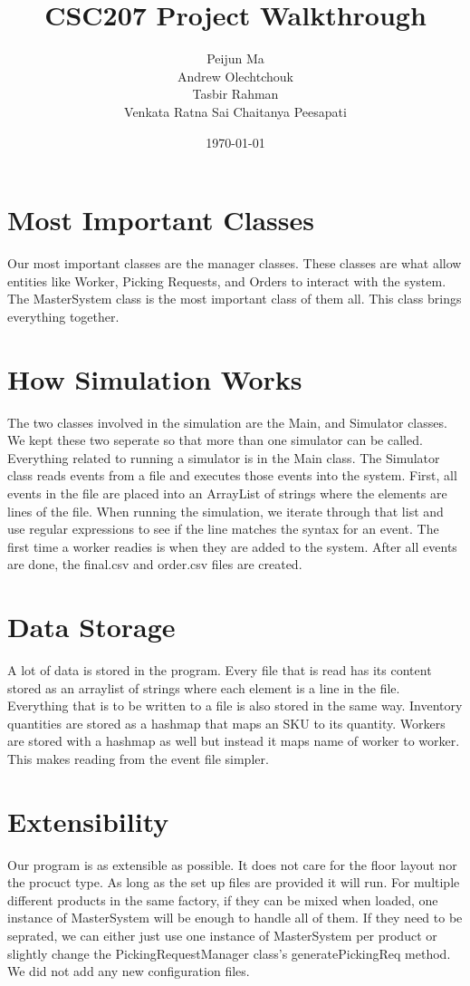 \documentclass[12pt]{article}
\title{CSC207 Project Walkthrough}
\author{Peijun Ma\\Andrew Olechtchouk\\Tasbir Rahman\\Venkata Ratna Sai Chaitanya Peesapati}
\date{\today}
\begin{document}
    \maketitle
    \pagebreak

\section*{Most Important Classes}
	Our most important classes are the manager classes. These classes are what allow entities like Worker, Picking Requests,
and Orders to interact with the system. The MasterSystem class is the most important class of them all. This class brings everything together.
\pagebreak

\section*{How Simulation Works}
	The two classes involved in the simulation are the Main, and Simulator classes. We kept these two seperate so that more
than one simulator can be called. Everything related to running a simulator is in the Main class. The Simulator class reads events from a file and executes those events into the system. First, all events in the file are placed into an ArrayList of strings where the elements are lines of the file. When running the simulation, we iterate through that list and use regular expressions to see if the line matches the syntax for an event. The first time a worker readies is when they are added to the system. After
all events are done, the final.csv and order.csv files are created.
\pagebreak

\section*{Data Storage}
	A lot of data is stored in the program. Every file that is read has its content stored as an arraylist of strings where each element is a line in the file. Everything that is to be written to a file is also stored in the same way. Inventory quantities are stored as a hashmap that maps an SKU to its quantity. Workers are stored with a hashmap as well but instead it maps name of worker to worker. This makes reading from the event file simpler.
\pagebreak
\section*{Extensibility}
    Our program is as extensible as possible. It does not care for the floor layout nor the procuct type. As long as the set up files are provided it will run. For multiple different products in the same factory, if they can be mixed when loaded, one instance of MasterSystem will be enough to handle all of them. If they need to be seprated, we can either just use one instance of MasterSystem per product or slightly change the PickingRequestManager class's generatePickingReq method. We did not add any new configuration files.
\pagebreak
\end{document}
